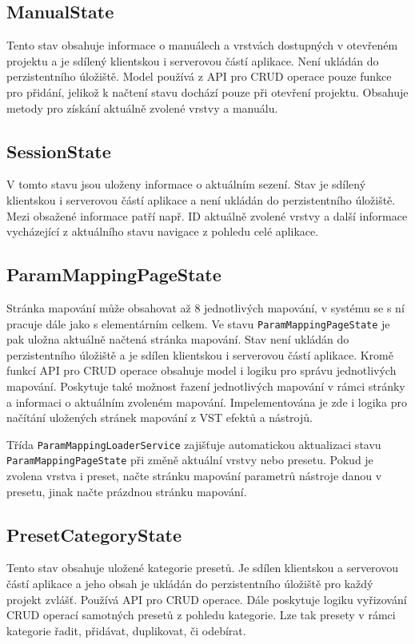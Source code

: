 \documentclass[thesis=M,czech]{FITthesis}[2019/03/06]
\begin{document}
		\subsection{ManualState}
			Tento stav obsahuje informace o manuálech a vrstvách dostupných v otevřeném projektu a je sdílený klientskou i serverovou částí aplikace. Není ukládán do perzistentního úložiště.
			Model používá z API pro CRUD operace pouze funkce pro přidání, jelikož k načtení stavu
			dochází pouze při otevření projektu. Obsahuje metody pro získání aktuálně zvolené vrstvy a manuálu.
		
		\subsection{SessionState}
			V tomto stavu jsou uloženy informace o aktuálním sezení. Stav je sdílený klientskou i serverovou částí aplikace a není ukládán do perzistentního úložiště.
			Mezi obsažené informace patří např. ID aktuálně zvolené vrstvy a další informace vycházející z aktuálního stavu navigace z pohledu celé aplikace.
			
		\subsection{ParamMappingPageState}
			Stránka mapování může obsahovat až 8 jednotlivých mapování, v systému se s ní pracuje dále jako s elementárním celkem. 
			Ve stavu \texttt{ParamMappingPageState} je pak uložna aktuálně načtená stránka mapování. Stav není ukládán do perzistentního úložiště a je sdílen klientskou i serverovou částí aplikace. 
			Kromě funkcí API pro CRUD operace obsahuje model i logiku pro správu jednotlivých mapování. 
			Poskytuje také možnost řazení jednotlivých mapování v rámci stránky a informaci
			o aktuálním zvoleném mapování. Impelementována je zde i logika pro načítání uložených stránek mapování
			z VST efektů a nástrojů.

			Třída \texttt{Param\-Mapping\-Loader\-Service} zajišťuje automatickou aktualizaci stavu \texttt{Param\-Mapping\-Page\-State} při změně aktuální vrstvy nebo presetu. Pokud je zvolena vrstva i preset, načte stránku mapování parametrů nástroje danou v presetu, jinak načte prázdnou stránku mapování.			
			
		\subsection{PresetCategoryState}
			Tento stav obsahuje uložené kategorie presetů. Je sdílen klientskou a serverovou částí aplikace
			a jeho obsah je ukládán do perzistentního úložiště pro každý projekt zvlášť.
			Používá API pro CRUD operace. Dále poskytuje logiku vyřizování CRUD operací samotných presetů
			z pohledu kategorie. Lze tak presety v rámci kategorie řadit, přidávat, duplikovat, či odebírat.
			
\end{document}
